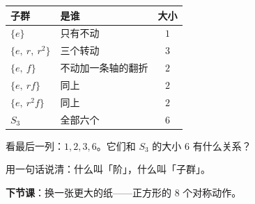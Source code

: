 \begin{example}[\(S_3\) 里的全部子群]
  \begin{center}
  \begin{tabular}{@{}llc@{}}
    \toprule
    子群 & 是谁 & 大小 \\
    \midrule
    \(\{e\}\) & 只有不动 & \(1\) \\
    \(\{e,\ r,\ r^2\}\) & 三个转动 & \(3\) \\
    \(\{e,\ f\}\) & 不动加一条轴的翻折 & \(2\) \\
    \(\{e,\ rf\}\) & 同上 & \(2\) \\
    \(\{e,\ r^2f\}\) & 同上 & \(2\) \\
    \(S_3\) & 全部六个 & \(6\) \\
    \bottomrule
  \end{tabular}
  \end{center}
\end{example}

\begin{sikao}
  看最后一列：\(1,2,3,6\)。它们和 \(S_3\) 的大小 \(6\) 有什么关系？
\end{sikao}

\begin{xiaojie}
  用一句话说清：什么叫「阶」，什么叫「子群」。
\end{xiaojie}

\noindent\textbf{下节课}：换一张更大的纸——正方形的 \(8\) 个对称动作。